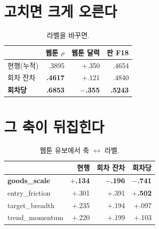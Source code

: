 \documentclass[10pt]{article}
\begin{document}

\section{고치면 크게 오른다}

\begin{table}[t]
\centering\tsize
\caption{라벨을 바꾸면.}
\begin{tabular}{lrrr}
\toprule
& 웹툰 $\rho$ & 웹툰 달력 & 판 F18 \\
\midrule
현행(누적) & .3895 & $+$.350 & .4654 \\
회차 잔차 & \textbf{.4617} & $+$.121 & .4840 \\
\textbf{회차당} & \textbf{.6853} & \textbf{$-$.355} & \textbf{.5243} \\
\bottomrule
\end{tabular}
\end{table}


\section{그 축이 뒤집힌다}

\begin{table}[t]
\centering\tsize
\caption{웹툰 유보에서 축 $\leftrightarrow$ 라벨.}
\begin{tabular}{lrrr}
\toprule
& 현행 & 회차 잔차 & 회차당 \\
\midrule
\textbf{goods\_scale} & \textbf{$+$.134} & \textbf{$-$.196} & \textbf{$-$.741} \\
entry\_friction & $+$.301 & $+$.391 & \textbf{$+$.502} \\
target\_breadth & $+$.235 & $+$.194 & $+$.097 \\
trend\_momentum & $+$.220 & $+$.199 & $+$.103 \\
\bottomrule
\end{tabular}
\end{table}
\end{document}
